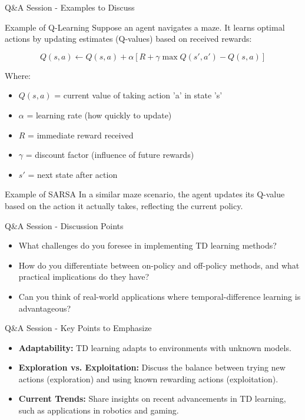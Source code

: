 \documentclass[aspectratio=169]{beamer}
\begin{document}
\begin{frame}[fragile]{Q\&A Session - Examples to Discuss}
    \begin{block}{Example of Q-Learning}
        Suppose an agent navigates a maze. It learns optimal actions by updating estimates (Q-values) based on received rewards:

        \begin{equation}
            Q(s, a) \leftarrow Q(s, a) + \alpha \left[R + \gamma \max Q(s', a') - Q(s, a)\right]
        \end{equation}

        Where:
        \begin{itemize}
            \item $Q(s, a)$ = current value of taking action 'a' in state 's'
            \item $\alpha$ = learning rate (how quickly to update)
            \item $R$ = immediate reward received
            \item $\gamma$ = discount factor (influence of future rewards)
            \item $s'$ = next state after action
        \end{itemize}
    \end{block}

    \begin{block}{Example of SARSA}
        In a similar maze scenario, the agent updates its Q-value based on the action it actually takes, reflecting the current policy.
    \end{block}
\end{frame}

\begin{frame}[fragile]{Q\&A Session - Discussion Points}
    \begin{itemize}
        \item What challenges do you foresee in implementing TD learning methods?
        \item How do you differentiate between on-policy and off-policy methods, and what practical implications do they have?
        \item Can you think of real-world applications where temporal-difference learning is advantageous?
    \end{itemize}
\end{frame}

\begin{frame}[fragile]{Q\&A Session - Key Points to Emphasize}
    \begin{itemize}
        \item \textbf{Adaptability:} TD learning adapts to environments with unknown models.
        \item \textbf{Exploration vs. Exploitation:} Discuss the balance between trying new actions (exploration) and using known rewarding actions (exploitation).
        \item \textbf{Current Trends:} Share insights on recent advancements in TD learning, such as applications in robotics and gaming.
    \end{itemize}
\end{frame}
\end{document}
